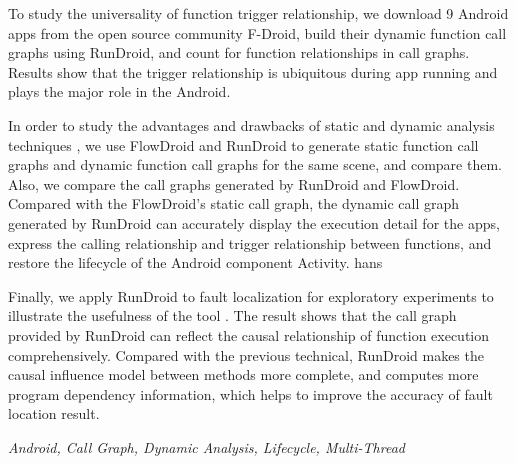 To study the universality of function trigger relationship, we download 9 Android apps from the open source community F-Droid, build their dynamic function call graphs using RunDroid, and count for function relationships in call graphs.
Results show that the trigger relationship is ubiquitous during app running and plays the major role in the Android.







In order to study the advantages and drawbacks of static and dynamic analysis techniques , we use FlowDroid and RunDroid to generate static function call graphs and dynamic function call graphs for the same scene, and compare them.
Also, we compare the call graphs generated by RunDroid and FlowDroid.
Compared with the FlowDroid's static call graph, the dynamic call graph generated by RunDroid can accurately display the execution detail for the apps, express the calling relationship and trigger relationship between functions, and restore the lifecycle of the Android component Activity.
hans


Finally, we apply RunDroid to fault localization for exploratory experiments to illustrate the usefulness of the tool .
The result shows that the call graph provided by RunDroid can  reflect the causal relationship of function execution comprehensively.
Compared with the previous technical, RunDroid makes the causal influence model between methods more complete, and computes more program dependency information, which helps to improve the accuracy of fault location result.






{} \textit{Android, Call Graph, Dynamic Analysis, Lifecycle, Multi-Thread}



































